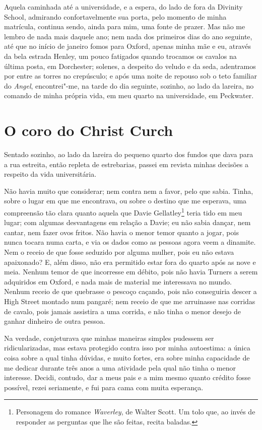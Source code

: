 Aquela caminhada até a universidade, e a espera, do lado de fora da
Divinity School, admirando confortavelmente sua porta, pelo momento de
minha matrícula, continua sendo, ainda para mim, uma fonte de prazer.
Mas não me lembro de nada mais daquele ano; nem nada dos primeiros dias
do ano seguinte, até que no início de janeiro fomos para Oxford, apenas
minha mãe e eu, através da bela estrada Henley, um pouco fatigados
quando trocamos os cavalos na última posta, em Dorchester; solenes, a
despeito do veludo e da seda, adentramos por entre as torres no
crepúsculo; e após uma noite de repouso sob o teto familiar do
\textit{Angel}, encontrei"-me, na tarde do dia seguinte, sozinho, ao lado da
lareira, no comando de minha própria vida, em meu quarto na
universidade, em Peckwater.

\chapter{O coro do Christ Curch} %

Sentado sozinho, ao lado da lareira do pequeno quarto dos fundos
que dava para a rua estreita, então repleta de estrebarias, passei em
revista minhas decisões a respeito da vida universitária.

Não havia muito que considerar; nem contra nem a favor, pelo que sabia.
Tinha, sobre o lugar em que me encontrava, ou sobre o destino que me
esperava, uma compreensão tão clara quanto aquela que Davie
Gellatley\footnote{Personagem do romance \textit{Waverley}, de Walter
  Scott. Um tolo que, ao invés de responder as perguntas que lhe são
  feitas, recita baladas.} teria tido em meu lugar; com
algumas desvantagens em relação a Davie; eu não sabia dançar, nem
cantar, nem fazer ovos fritos. Não havia o menor temor quanto a jogar,
pois nunca tocara numa carta, e via os dados como as pessoas agora veem
a dinamite. Nem o receio de que fosse seduzido por alguma mulher, pois
eu não estava apaixonado? E, além disso, não era permitido estar fora do
quarto após as nove e meia. Nenhum temor de que incorresse em débito,
pois não havia Turners a serem adquiridos em Oxford, e nada mais de
material me interessava no mundo. Nenhum receio de que quebrasse o
pescoço caçando, pois não conseguiria descer a High Street montado num
pangaré; nem receio de que me arruinasse nas corridas de cavalo, pois
jamais assistira a uma corrida, e não tinha o menor desejo de ganhar
dinheiro de outra pessoa.

Na verdade, conjeturava que minhas maneiras simples pudessem ser
ridicularizadas, mas estava protegido contra isso por minha autoestima:
a única coisa sobre a qual tinha dúvidas, e muito fortes, era sobre
minha capacidade de me dedicar durante três anos a uma atividade pela
qual não tinha o menor interesse. Decidi, contudo, dar a meus pais e a
mim mesmo quanto crédito fosse possível, rezei seriamente, e fui para
cama com muita esperança.

